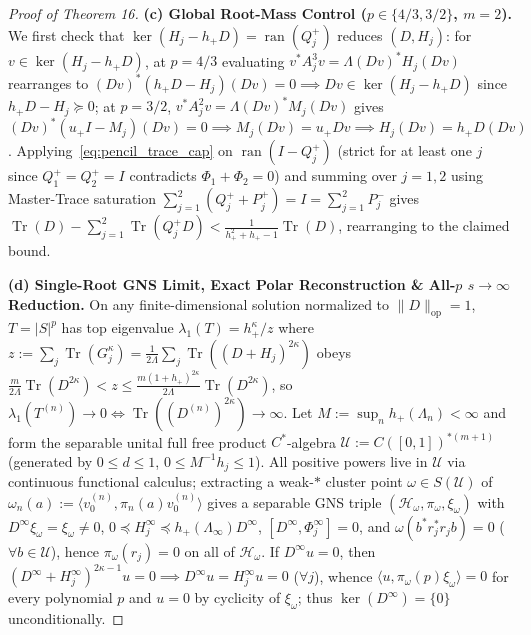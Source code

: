 \documentclass[10pt,letterpaper]{article}
\newcommand{\Hilb}{\mathcal{H}}
\newcommand{\Tr}{\operatorname{Tr}}
\newcommand{\ran}{\operatorname{ran}}
\newcommand{\op}{\mathrm{op}}
\begin{document}
\begin{proof}[Proof of Theorem 16]
\textbf{(c) Global Root-Mass Control ($p \in \{4/3, 3/2\}$, $m = 2$).}
We first check that $\ker(H_j - h_+ D) = \ran(Q_j^+)$ reduces $(D, H_j)$: for $v \in \ker(H_j - h_+ D)$, at $p = 4/3$ evaluating $v^* A_j^3 v = \Lambda(Dv)^* H_j (Dv)$ rearranges to $(Dv)^*(h_+ D - H_j)(Dv) = 0 \implies Dv \in \ker(H_j - h_+ D)$ since $h_+ D - H_j \succeq 0$; at $p = 3/2$, $v^* A_j^2 v = \Lambda (Dv)^* M_j (Dv)$ gives $(Dv)^*(u_+ I - M_j)(Dv) = 0 \implies M_j(Dv) = u_+ Dv \implies H_j(Dv) = h_+ D(Dv)$. Applying~\eqref{eq:pencil_trace_cap} on $\ran(I - Q_j^+)$ (strict for at least one $j$ since $Q_1^+ = Q_2^+ = I$ contradicts $\Phi_1 + \Phi_2 = 0$) and summing over $j = 1, 2$ using Master-Trace saturation $\sum_{j=1}^2 (Q_j^+ + P_j^+) = I = \sum_{j=1}^2 P_j^-$ gives $\Tr(D) - \sum_{j=1}^2 \Tr(Q_j^+ D) < \frac{1}{h_+^2 + h_+ - 1}\Tr(D)$, rearranging to the claimed bound.

\textbf{(d) Single-Root GNS Limit, Exact Polar Reconstruction \& All-$p$ $s \to \infty$ Reduction.}
On any finite-dimensional solution normalized to $\|D\|_{\op} = 1$, $T = |S|^p$ has top eigenvalue $\lambda_1(T) = h_+^\kappa/z$ where $z := \sum_j \Tr(G_j^\kappa) = \frac{1}{2\Lambda}\sum_j \Tr((D+H_j)^{2\kappa})$ obeys $\frac{m}{2\Lambda}\Tr(D^{2\kappa}) < z \le \frac{m(1+h_+)^{2\kappa}}{2\Lambda}\Tr(D^{2\kappa})$, so $\lambda_1(T^{(n)}) \to 0 \iff \Tr((D^{(n)})^{2\kappa}) \to \infty$. Let $M := \sup_n h_+(\Lambda_n) < \infty$ and form the separable unital full free product $C^*$-algebra $\mathcal{U} := C([0,1])^{*(m+1)}$ (generated by $0 \le d \le 1$, $0 \le M^{-1} h_j \le 1$). All positive powers live in $\mathcal{U}$ via continuous functional calculus; extracting a weak-$*$ cluster point $\omega \in S(\mathcal{U})$ of $\omega_n(a) := \langle v_0^{(n)}, \pi_n(a) v_0^{(n)}\rangle$ gives a separable GNS triple $(\Hilb_\omega, \pi_\omega, \xi_\omega)$ with $D^\infty \xi_\omega = \xi_\omega \neq 0$, $0 \preceq H_j^\infty \preceq h_+(\Lambda_\infty) D^\infty$, $[D^\infty, \Phi_j^\infty] = 0$, and $\omega(b^* r_j^* r_j b) = 0$ ($\forall b \in \mathcal{U}$), hence $\pi_\omega(r_j) = 0$ on all of $\Hilb_\omega$. If $D^\infty u = 0$, then $(D^\infty + H_j^\infty)^{2\kappa-1} u = 0 \implies D^\infty u = H_j^\infty u = 0$ ($\forall j$), whence $\langle u, \pi_\omega(p)\xi_\omega\rangle = 0$ for every polynomial $p$ and $u = 0$ by cyclicity of $\xi_\omega$; thus $\ker(D^\infty) = \{0\}$ unconditionally.


\end{proof}
\end{document}
